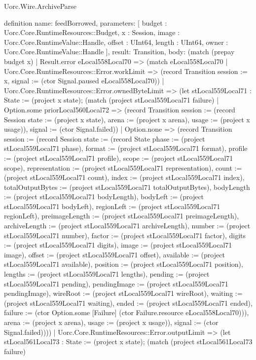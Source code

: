 \begin{lexlean}{Uorc.Wire.ArchiveParse}
\begin{semanticmodule}
definition{
  name: feedBorrowed,
  parameters: [
    budget : Uorc.Core.RuntimeResources::Budget,
    x : Session,
    image : Uorc.Core.RuntimeValue::Handle,
    offset : UInt64,
    length : UInt64,
    owner : Uorc.Core.RuntimeValue::Handle
  ],
  result: Transition,
  body: (match (prepay budget x)
    | Result.error eLocal558Local70 => (match eLocal558Local70
      | Uorc.Core.RuntimeResources::Error.workLimit => (record Transition {session := x, signal := (ctor Signal.paused eLocal558Local70)})
      | Uorc.Core.RuntimeResources::Error.ownedByteLimit => (let stLocal559Local71 : State := (project x state); (match (project stLocal559Local71 failure)
        | Option.some priorLocal560Local72 => (record Transition {session := (record Session {state := (project x state), arena := (project x arena), usage := (project x usage)}), signal := (ctor Signal.failed)})
        | Option.none => (record Transition {session := (record Session {state := (record State {phase := (project stLocal559Local71 phase), format := (project stLocal559Local71 format), profile := (project stLocal559Local71 profile), scope := (project stLocal559Local71 scope), representation := (project stLocal559Local71 representation), count := (project stLocal559Local71 count), index := (project stLocal559Local71 index), totalOutputBytes := (project stLocal559Local71 totalOutputBytes), bodyLength := (project stLocal559Local71 bodyLength), bodyLeft := (project stLocal559Local71 bodyLeft), regionLeft := (project stLocal559Local71 regionLeft), preimageLength := (project stLocal559Local71 preimageLength), archiveLength := (project stLocal559Local71 archiveLength), number := (project stLocal559Local71 number), factor := (project stLocal559Local71 factor), digits := (project stLocal559Local71 digits), image := (project stLocal559Local71 image), offset := (project stLocal559Local71 offset), available := (project stLocal559Local71 available), position := (project stLocal559Local71 position), lengths := (project stLocal559Local71 lengths), pending := (project stLocal559Local71 pending), pendingImage := (project stLocal559Local71 pendingImage), wireRoot := (project stLocal559Local71 wireRoot), waiting := (project stLocal559Local71 waiting), ended := (project stLocal559Local71 ended), failure := (ctor Option.some [Failure] (ctor Failure.resource eLocal558Local70))}), arena := (project x arena), usage := (project x usage)}), signal := (ctor Signal.failed)})))
      | Uorc.Core.RuntimeResources::Error.outputLimit => (let stLocal561Local73 : State := (project x state); (match (project stLocal561Local73 failure)
}
\end{semanticmodule}
\end{lexlean}
